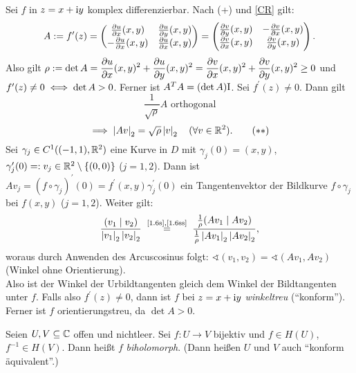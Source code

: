 \documentclass[a4paper,twoside,DIV15,BCOR12mm]{scrbook}
\begin{document}
\begin{bem} \label{bem1.6}
Sei $f$ in $z = x+\mathrm{i} y$ komplex differenzierbar. Nach (+) und \eqref{CR} gilt:
\begin{equation}\label{1.4}
A \da f^\prime(z) = \left(\!\!\!\begin{array}{c c}\frac{\partial u}{\partial x}(x,y)&\frac{\partial u}{\partial y}(x,y)\\-\frac{\partial u}{\partial x}(x,y)&\frac{\partial u}{\partial x}(x,y)\end{array}\!\!\!\right) = \left(\!\!\!\begin{array}{c c}\frac{\partial v}{\partial y}(x,y)&-\frac{\partial v}{\partial x}(x,y)\\\frac{\partial v}{\partial x}(x,y)&\frac{\partial v}{\partial y}(x,y)\end{array}\!\!\!\right).
\end{equation}
Also gilt $\rho := \displaystyle \det A = \frac{\partial u}{\partial x}(x,y)^2 + \frac{\partial u}{\partial y}(x,y)^2 =
\frac{\partial v}{\partial x}(x,y)^2 + \frac{\partial v}{\partial y}(x,y)^2 \geq 0$ und \\ $f^\prime(z) \neq 0 \iff \det A > 0$.
Ferner ist $A^TA = (\det A)\mathrm{I}$. Sei $f^\prime(z) \neq 0$. Dann gilt
\[\label{1.6s}\frac{1}{\sqrt{\rho}}A \text{ orthogonal} \tag{$*$}\]
\[\label{1.6ss}\implies \left\lvert Av\right\lvert_2 = \sqrt{\rho} \left\lvert v\right\lvert_2 \quad (\forall v \in \mathbb{R}^2). \tag{$**$}\]
Sei $\gamma_j \in C^1((-1,1), \mathbb{R}^2)$ eine Kurve in $D$ mit $\gamma_j(0) = (x, y)$, $\gamma_j^\prime(0) =: v_j \in \mathbb{R}^2
\setminus \{(0,0)\}$ ($j=1,2$). Dann ist $Av_j = (f \circ \gamma_j)^\prime(0) = f^\prime(x, y) \gamma_j^\prime(0)$ ein
Tangentenvektor der Bildkurve $f \circ \gamma_j$ bei $f(x, y)$ ($j=1,2$). Weiter gilt: \[\frac{(v_1\mid v_2)}{\abs{v_1}_2
  \abs{v_2}_2} \nach{=}{\eqref{1.6s},\eqref{1.6ss}} \frac{\frac1\rho (Av_1\mid Av_2)}{\frac1\rho \abs{Av_1}_2 \abs{Av_2}_2},\]
woraus durch Anwenden des Arcuscosinus folgt: $\sphericalangle(v_1,v_2) = \sphericalangle(Av_1,Av_2)$ (Winkel ohne Orientierung).\\
Also ist der Winkel der Urbildtangenten gleich dem Winkel der Bildtangenten unter $f$. Falls also $f^\prime(z)\neq0$, dann ist
$f$ bei $z=x+\mathrm{i} y$ \emph{winkeltreu} ("`konform"'). Ferner ist $f$ orientierungstreu, da $\det A > 0$.
\end{bem}

\begin{dfn} \label{dfn1.7}
Seien $U, V \subseteq \mathbb{C}$ offen und nichtleer. Sei $f\colon U \to V$ bijektiv und $f\in H(U)$, $f^{-1}\in H(V)$. Dann heißt $f$ \emph{biholomorph}. (Dann heißen $U$ und $V$ auch "`konform äquivalent"'.)
\end{dfn}
\end{document}
